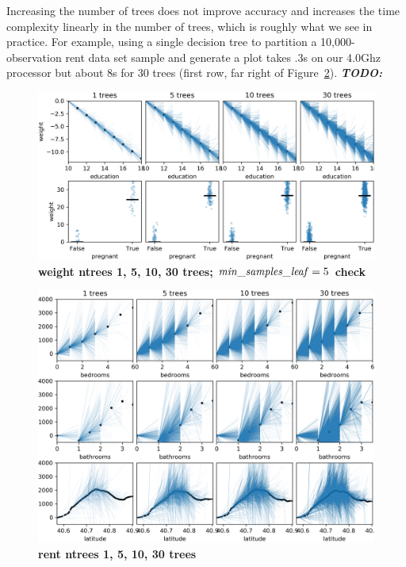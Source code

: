 \documentclass[12pt]{article}
\newcommand{\figref}[1]{Figure~\ref{#1}}
\newcommand{\todo}[1]{{\bf\em TODO:} {{\color{red}{#1}}}}
\begin{document}
Increasing the number of trees does not improve accuracy and increases the time complexity linearly in the number of trees, which is roughly what we see in practice.  For example, using a single decision tree to partition a 10,000-observation rent data set sample and generate a plot takes .3s on our 4.0Ghz processor but about 8s for 30 trees (first row, far right of \figref{fig:rent_ntrees}). \todo{seems less accuarate with bootstrap}

\begin{figure}[htbp]
\begin{center}
\includegraphics[scale=0.5]{images/education_pregnant_vs_weight_ntrees.png}
\caption{{\bf  weight ntrees 1, 5, 10, 30 trees; ${\it min\_samples\_leaf}=5$ check}}
\label{fig:weight_ntrees}
\end{center}
\end{figure}

\begin{figure}[htbp]
\begin{center}
\includegraphics[scale=0.5]{images/rent_ntrees.png}
\caption{{\bf  rent ntrees 1, 5, 10, 30 trees}}
\label{fig:rent_ntrees}
\end{center}
\end{figure}
\end{document}
